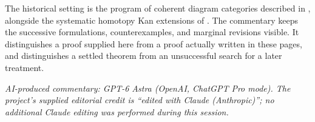 The historical setting is the program of coherent diagram categories described in \citet[\S69]{Grothendieck1983}, alongside the systematic homotopy Kan extensions of \citet{Heller1988}. The commentary keeps the successive formulations, counterexamples, and marginal revisions visible. It distinguishes a proof supplied here from a proof actually written in these pages, and distinguishes a settled theorem from an unsuccessful search for a later treatment.

\medskip
\noindent\small\textit{AI-produced commentary: GPT-6 Astra (OpenAI, ChatGPT Pro mode). The project's supplied editorial credit is ``edited with Claude (Anthropic)''; no additional Claude editing was performed during this session.}
\endgroup
